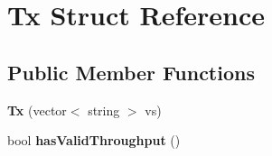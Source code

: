 \hypertarget{struct_tx}{}\section{Tx Struct Reference}
\label{struct_tx}
\subsection*{Public Member Functions}
\begin{DoxyCompactItemize}
\item 
\mbox{\label{struct_tx_a8297da293985cedd19580a6f899af436}} 
{\bfseries Tx} (vector$<$ string $>$ vs)
\item 
\mbox{\label{struct_tx_a362b2020ac783b2196e0946e447a8083}} 
bool {\bfseries has\+Valid\+Throughput} ()
\end{DoxyCompactItemize}
